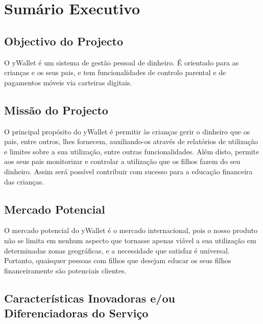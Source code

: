 \documentclass[12pt,a4paper]{article}
\begin{document}


\tableofcontents

\listoftables

\newpage
\section{Sumário Executivo}
\label{sec:sumario_executivo}

\subsection{Objectivo do Projecto}
\label{subsec:objectivo_do_projecto}

O yWallet é um sistema de gestão pessoal de dinheiro. É orientado para as crianças e os seus pais, e tem funcionalidades de controlo parental e de pagamentos móveis via carteiras digitais.

\subsection{Missão do Projecto}
\label{subsec:missao_do_projecto}

O principal propósito do yWallet é permitir às crianças gerir o dinheiro que os pais, entre outros, lhes fornecem, auxiliando-os através de relatórios de utilização e limites sobre a sua utilização, entre outras funcionalidades. Além disto, permite aos seus pais monitorizar e controlar a utilização que os filhos fazem do seu dinheiro. Assim será possível contribuir com sucesso para a educação financeira das crianças.

\subsection{Mercado Potencial}
\label{subsec:mercado_potencial}

O mercado potencial do yWallet é o mercado internacional, pois o nosso produto não se limita em nenhum aspecto que tornasse apenas viável a sua utilização em determinadas zonas geográficas, e a necessidade que satisfaz é universal. Portanto, quaisquer pessoas com filhos que desejam educar os seus filhos financeiramente são potenciais clientes.

\subsection{Características Inovadoras e/ou Diferenciadoras do Serviço}
\label{subsec:caracteristicas_inovadoras_e/ou_Diferenciadoras_do_Servico}
\end{document}
